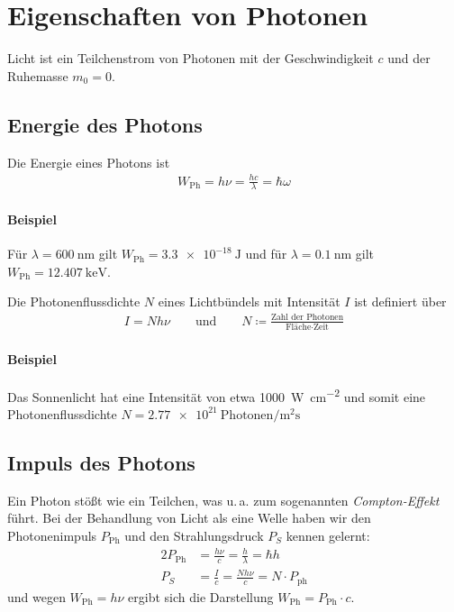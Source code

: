 
\section{Eigenschaften von Photonen}
Licht ist ein Teilchenstrom von Photonen mit der Geschwindigkeit $c$
und der Ruhemasse $m_0=0$.


\subsection{Energie des Photons}
Die Energie eines Photons ist
\begin{gather*}
  W_\text{Ph} = h\nu = \frac{hc}{\lambda} = \hbar\omega
\end{gather*}%
%

\paragraph*{Beispiel}
Für $\lambda=\SI{600}{\nano\meter}$ gilt
$W_\text{Ph}=\SI{3.3e-18}{\joule}$
und für $\lambda=\SI{0.1}{\nano\meter}$ gilt
$W_\text{Ph}=\SI{12.407}{\kilo\electronvolt}$.

Die Photonenflussdichte $N$
eines Lichtbündels mit Intensität $I$ ist definiert über
\begin{gather*}
  I = Nh\nu
  \qquad\text{und}\qquad
  N \coloneqq 
  \frac{\text{Zahl der Photonen}}{\text{Fläche}\cdot\text{Zeit}}
\end{gather*}

\paragraph*{Beispiel}
Das Sonnenlicht hat eine Intensität von etwa
\SI{1000}{\watt\per\centi\meter\squared} und somit eine
Photonenflussdichte
$N=\SI{2.77e21}{{\text{Photonen}}\per\square\meter\second}$


\subsection{Impuls des Photons}
Ein Photon stößt wie ein Teilchen, was u.\,a. zum sogenannten
\emph{Compton-Effekt} führt.
Bei der Behandlung von Licht als eine Welle haben wir den
Photonenimpuls $P_\text{Ph}$ und den Strahlungsdruck $P_S$ kennen
gelernt:
\begin{alignat*}{2}
  P_\text{Ph} &= \frac{h\nu}{c} = \frac{h}{\lambda} = \hbar h\\
  P_S &= \frac{I}{c} = \frac{Nh\nu}{c} = N\cdot P_\text{ph}
\end{alignat*}
und wegen $W_\text{Ph}=h\nu$ ergibt sich die Darstellung
$W_\text{Ph} = P_\text{Ph}\cdot c$.


